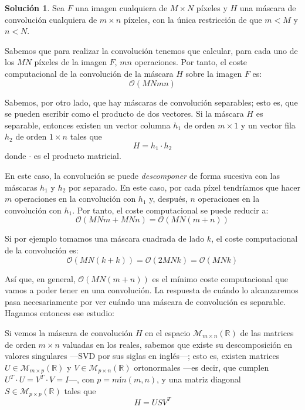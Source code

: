 \documentclass[a4paper, 11pt]{article}
\theoremstyle{definition}
\newtheorem*{solucion}{Solución}
\theoremstyle{theorem}
\begin{document}
  \begin{solucion}
      Sea $F$ una imagen cualquiera de $M \times N$ píxeles y $H$ una máscara de convolución cualquiera de $m \times n$ píxeles, con la única restricción de que $m<M$ y $n<N$.

      Sabemos que para realizar la convolución tenemos que calcular, para cada uno de los $MN$ píxeles de la imagen $F$, $mn$ operaciones. Por tanto, el coste computacional de la convolución de la máscara $H$ sobre la imagen $F$ es:
      \[
      \mathcal{O}(MNmn)
      \]

      Sabemos, por otro lado, que hay máscaras de convolución separables; esto es, que se pueden escribir como el producto de dos vectores. Si la máscara $H$ es separable, entonces existen un vector columna $h_1$ de orden $m \times 1$ y un vector fila $h_2$ de orden $1 \times n$ tales que
      \[
      H = h_1 \cdot h_2
      \]
      donde $\cdot$ es el producto matricial.

      En este caso, la convolución se puede \emph{descomponer} de forma sucesiva con las máscaras $h_1$ y $h_2$ por separado. En este caso, por cada píxel tendríamos que hacer $m$ operaciones en la convolución con $h_1$ y, después, $n$ operaciones en la convolución con $h_1$. Por tanto, el coste computacional se puede reducir a:
      \[
      \mathcal{O}(MNm+MNn) = \mathcal{O}(MN(m+n))
      \]

      Si por ejemplo tomamos una máscara cuadrada de lado $k$, el coste computacional de la convolución es:
      \[
      \mathcal{O}(MN(k+k)) = \mathcal{O}(2MNk) = \mathcal{O}(MNk)
      \]

      Así que, en general, $\mathcal{O}(MN(m+n))$ es el mínimo coste computacional que vamos a poder tener en una convolución. La respuesta de cuándo lo alcanzaremos pasa necesariamente por ver cuándo una máscara de convolución es separable. Hagamos entonces ese estudio:

      Si vemos la máscara de convolución $H$ en el espacio $\mathcal{M}_{m\times n}(\mathbb{R})$ de las matrices de orden $m\times n$ valuadas en los reales, sabemos que existe su descomposición en valores singulares ---SVD por sus siglas en inglés---; esto es, existen matrices $U\in\mathcal{M}_{m\times p}(\mathbb{R})$ y $V\in\mathcal{M}_{p\times n}(\mathbb{R})$ ortonormales ---es decir, que cumplen $U^T\cdot U=V^T\cdot V=I$---, con $p=mín(m,n)$, y una matriz diagonal $S\in\mathcal{M}_{p\times p}(\mathbb{R})$ tales que
      \begin{equation}
          H = USV^T \label{SVD}
      \end{equation}


\end{solucion}
\end{document}
